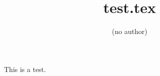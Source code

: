 \documentclass{article}
\begin{document}
\title{test.tex}
\author{(no author)}
\maketitle
This is a test.
\end{document}
